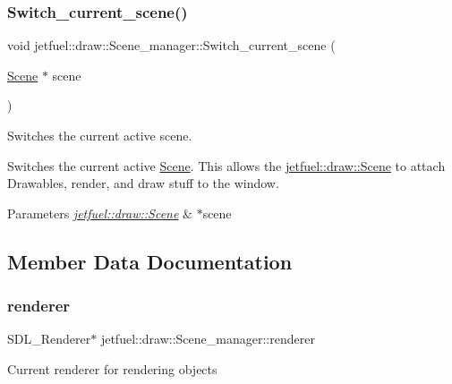 \subsubsection{\texorpdfstring{Switch\+\_\+current\+\_\+scene()}{Switch\_current\_scene()}}
{\footnotesize\ttfamily void jetfuel\+::draw\+::\+Scene\+\_\+manager\+::\+Switch\+\_\+current\+\_\+scene (\begin{DoxyParamCaption}\item[{\hyperlink{classjetfuel_1_1draw_1_1Scene}{Scene} $\ast$}]{scene }\end{DoxyParamCaption})}



Switches the current active scene. 

Switches the current active \hyperlink{classjetfuel_1_1draw_1_1Scene}{Scene}. This allows the \hyperlink{classjetfuel_1_1draw_1_1Scene}{jetfuel\+::draw\+::\+Scene} to attach Drawables, render, and draw stuff to the window.


\begin{DoxyParams}{Parameters}
{\em \hyperlink{classjetfuel_1_1draw_1_1Scene}{jetfuel\+::draw\+::\+Scene}} & $\ast$scene \\
\hline
\end{DoxyParams}


\subsection{Member Data Documentation}
\mbox{\label{classjetfuel_1_1draw_1_1Scene__manager_a34a22a19dd956074c9101f25414e3e1c}} 
\subsubsection{\texorpdfstring{renderer}{renderer}}
{\footnotesize\ttfamily S\+D\+L\+\_\+\+Renderer$\ast$ jetfuel\+::draw\+::\+Scene\+\_\+manager\+::renderer\hspace{0.3cm}{\ttfamily [protected]}}

Current renderer for rendering objects \mbox{\label{classjetfuel_1_1draw_1_1Scene__manager_a7613c251e515e82f62b87126a92b33b4}} 

